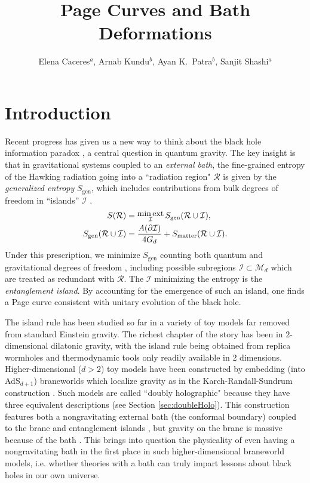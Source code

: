 \documentclass[12pt,a4paper]{article}
\title{Page Curves and Bath Deformations}
\author{Elena Caceres$^{a}$, Arnab Kundu$^{b}$, Ayan K.~Patra$^{b}$, Sanjit Shashi$^{a}$}
\affiliation{$^a$Theory Group, Department of Physics, University of Texas, Austin, TX 78712, USA.}
\affiliation{$^b$Theory Division, Saha Institute of Nuclear Physics, HBNI, 1/AF Bidhannagar, Kolkata 700064, India.}
\newcommand{\elena}[1]{\textcolor{black!40!lime}{\textbf{??EC:} #1}}
\newcommand{\arnab}[1]{\textcolor{black!40!yellow}{\textbf{??AK:} #1}}
\newcommand{\ayan}[1]{\textcolor{cyan}{\textbf{??AKP:} #1}}
\newcommand{\sanjit}[1]{\textcolor{red}{\textbf{??SS:} #1}}
\begin{document}
	
\maketitle
\flushbottom

	
\section{Introduction}\label{sec1}


Recent progress has given us a new way to think about the black hole information paradox \cite{Hawking:1976ra}, a central question in quantum gravity. The key insight is that in gravitational systems coupled to an \textit{external bath}, the fine-grained entropy of the Hawking radiation going into a ``radiation region" $\mathcal{R}$ is given by the \textit{generalized entropy} $S_{\text{gen}}$, which includes contributions from bulk degrees of freedom in “islands” $\mathcal{I}$ \cite{Penington:2019npb,Almheiri:2019psf,Almheiri:2019hni,Almheiri:2020cfm}.
\begin{align}
S(\mathcal{R})
&= \substack{\text{\normalsize{min\,ext}}\\\mathcal{I}}\, S_{\text{gen}}(\mathcal{R}\cup \mathcal{I}),\\
S_{\text{gen}}(\mathcal{R}\cup \mathcal{I}) &=
\frac{A(\partial \mathcal{I})}{4G_{d}}+
S_{\text{matter}}(\mathcal{R}\cup \mathcal{I}).\label{genS}
\end{align}
Under this prescription, we minimize $S_{\text{gen}}$ counting both quantum and gravitational degrees of freedom \cite{Engelhardt:2014gca}, including possible subregions $\mathcal{I} \subset \mathcal{M}_d$ which are treated as redundant with $\mathcal{R}$. The $\mathcal{I}$ minimizing the entropy is the \textit{entanglement island}. By accounting for the emergence of such an island, one finds a Page curve consistent with unitary evolution of the black hole.

The island rule has been studied so far in a variety of toy models far removed from standard Einstein gravity. The richest chapter of the story has been in $2$-dimensional dilatonic gravity, with the island rule being obtained from replica wormholes \cite{Almheiri:2019qdq} and thermodynamic tools \cite{Pedraza:2021cvx,Pedraza:2021ssc} only readily available in 2 dimensions. Higher-dimensional ($d > 2$) toy models have been constructed by embedding (into AdS$_{d+1}$) braneworlds which localize gravity as in the Karch-Randall-Sundrum construction \cite{Randall:1999vf,Karch:2000ct,Karch:2000gx}. Such models are called ``doubly holographic" because they have three equivalent descriptions (see Section \ref{sec:doubleHolo}). This construction features both a nongravitating external bath (the conformal boundary) coupled to the brane and entanglement islands \cite{Almheiri:2019psy,Chen:2020uac,Chen:2020hmv,Geng:2021eps}, but gravity on the brane is massive because of the bath \cite{Geng:2020qvw}. This brings into question the physicality of even having a nongravitating bath in the first place in such higher-dimensional braneworld models, i.e. whether theories with a bath can truly impart lessons about black holes in our own universe.
\end{document}

